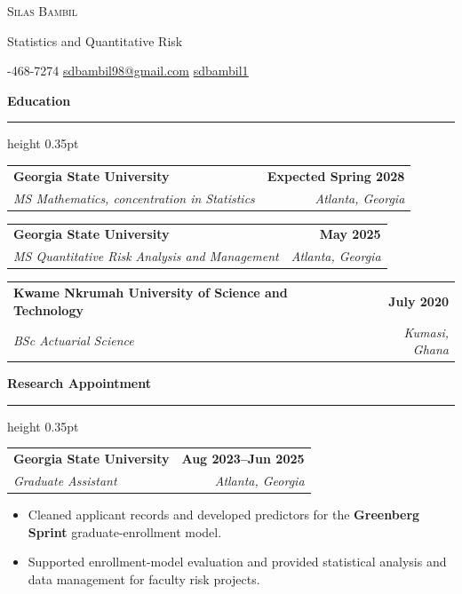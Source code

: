 \documentclass[11pt,letterpaper]{article}
\makeatletter
\newcommand{\phoneicon}{\faPhone\enspace}
\newcommand{\emailicon}{\faEnvelope\enspace}
\newcommand{\githubicon}{\faGithub\enspace}
\newcommand{\phoneicon}{}
\newcommand{\emailicon}{}
\newcommand{\githubicon}{GitHub:\enspace}
\newcommand{\cvsection}[1]{%
  \par\addvspace{4pt}
  {\large\bfseries #1}\par
  \nobreak\vspace{1pt}
  \hrule height 0.35pt
  \nobreak\vspace{3pt}
}
\newcommand{\entry}[4]{%
  \noindent\hspace*{6pt}%
  \begin{tabular*}{\dimexpr\textwidth-12pt\relax}
    {@{}l@{\extracolsep{\fill}}r@{}}
    {\normalsize\bfseries #1} & {\small\bfseries #2}\\
    {\small\itshape #3} & {\small\itshape #4}\\
  \end{tabular*}\par
}
\makeatother
\begin{document}

{\centering
  {\LARGE\scshape Silas Bambil}\par
  \vspace{2pt}
  {\normalsize Statistics and Quantitative Risk}\par
  \vspace{3pt}
  {\small
    \phoneicon 404-468-7274
    \quad
    \href{mailto:sdbambil98@gmail.com}{
      \emailicon sdbambil98@gmail.com}
    \quad
    \href{https://github.com/sdbambil1}{
      \githubicon sdbambil1}
  }\par
}
\vspace{4pt}

\small


\cvsection{Education}

\entry
  {Georgia State University}
  {Expected Spring 2028}
  {MS Mathematics, concentration in Statistics}
  {Atlanta, Georgia}

\vspace{2pt}

\entry
  {Georgia State University}
  {May 2025}
  {MS Quantitative Risk Analysis and Management}
  {Atlanta, Georgia}

\vspace{2pt}

\entry
  {Kwame Nkrumah University of Science and Technology}
  {July 2020}
  {BSc Actuarial Science}
  {Kumasi, Ghana}


\cvsection{Research Appointment}
\entry
  {Georgia State University}
  {Aug 2023--Jun 2025}
  {Graduate Assistant}
  {Atlanta, Georgia}

\begin{itemize}
  \item Cleaned applicant records and developed predictors
  for the \textbf{Greenberg Sprint}
  graduate-enrollment model.

  \item Supported enrollment-model evaluation and provided
  statistical analysis and data management for faculty
  risk projects.
\end{itemize}

\vspace{2pt}
\end{document}
